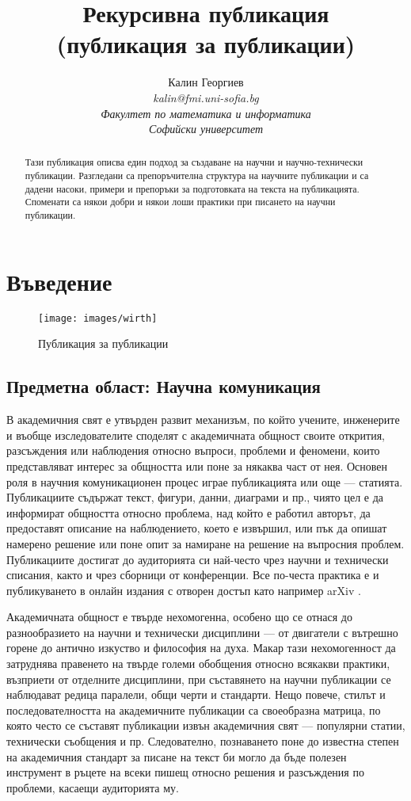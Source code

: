 \documentclass[11pt, oneside]{article}     %
\title{Рекурсивна публикация \\
(публикация за публикации)}
\author{Калин Георгиев\\ 
\textit{kalin@fmi.uni-sofia.bg}\\
\emph{Факултет по математика и информатика}\\\emph{Софийски университет}}
\begin{document}
\maketitle

\begin{abstract}
 Тази публикация описва един подход за създаване на научни и научно-технически публикации. Разгледани са препоръчителна структура на научните публикации и са дадени насоки, примери и препоръки за подготовката на текста на публикацията. Споменати са някои добри и някои лоши практики при писането на научни публикации.
\end{abstract}

\section{Въведение}
\begin{figure}[htbp]
  \centering
  \texttt{[image: images/wirth]}
  \caption[Да погледнем към себе си \cite{wirth}]
   {Публикация за публикации \cite{wirth}}
  \label{fig:wirth}
\end{figure}


\subsection* {Предметна област: Научна комуникация}

В академичния свят е утвърден развит механизъм, по който учените, инженерите и въобще изследователите споделят с академичната общност своите открития, разсъждения или наблюдения относно въпроси, проблеми и феномени, които представляват интерес за общността или поне за някаква част от нея. Основен роля в научния комуникационен процес играе публикацията или още --- статията. Публикациите съдържат текст, фигури, данни, диаграми и пр., чиято цел е да информират общността относно проблема, над който е работил авторът, да предоставят описание на наблюдението, което е извършил, или пък да опишат намерено решение или поне опит за намиране на решение на въпросния проблем. Публикациите достигат до аудиторията си най-често чрез научни и технически списания, както и чрез сборници от конференции. Все по-честа практика е и публикуването в онлайн издания с отворен достъп като например arXiv \cite{arxiv}.

Академичната общност е твърде нехомогенна, особено що се отнася до разнообразието на научни и технически дисциплини --- от двигатели с вътрешно горене до антично изкуство и философия на духа. Макар тази  нехомогенност да затруднява правенето на твърде големи обобщения относно всякакви практики, възприети от отделните дисциплини, при съставянето на научни публикации се наблюдават редица паралели,  общи черти и стандарти. Нещо повече, стилът и последователността на академичните публикации са своеобразна матрица, по която често се съставят публикации извън академичния свят --- популярни статии, технически съобщения и пр. Следователно, познаването поне до известна степен на академичния стандарт за писане на текст би могло да бъде полезен инструмент в ръцете на всеки пишещ относно решения и разсъждения по проблеми, касаещи аудиторията му. 
\end{document}
